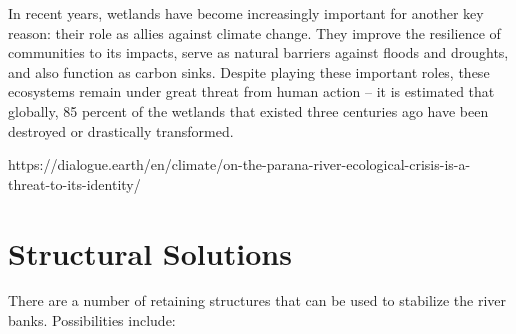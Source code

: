 In recent years, wetlands have become increasingly important for another key reason: their role as allies against climate change. They improve the resilience of communities to its impacts, serve as natural barriers against floods and droughts, and also function as carbon sinks. Despite playing these important roles, these ecosystems remain under great threat from human action – it is estimated that globally, 85 percent of the wetlands that existed three centuries ago have been destroyed or drastically transformed. 

https://dialogue.earth/en/climate/on-the-parana-river-ecological-crisis-is-a-threat-to-its-identity/


\newpage

\section{Structural Solutions}
There are a number of retaining structures that can be used to stabilize the river banks. Possibilities include:
